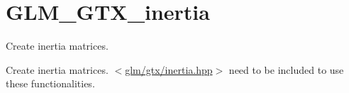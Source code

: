 \hypertarget{group__gtx__inertia}{\section{G\-L\-M\-\_\-\-G\-T\-X\-\_\-inertia}
\label{group__gtx__inertia}
}


Create inertia matrices.  


Create inertia matrices. $<$\hyperlink{inertia_8hpp}{glm/gtx/inertia.\-hpp}$>$ need to be included to use these functionalities. 